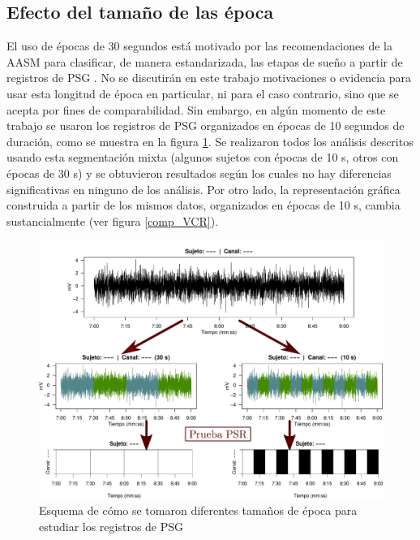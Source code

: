 
\subsection{Efecto del tama\~no de las \'epoca}

El uso de \'epocas de 30 segundos est\'a motivado por las recomendaciones de la AASM para 
clasificar, de manera estandarizada, las etapas de sue\~no a partir de registros de PSG 
\cite{AASM07}. 
No se discutir\'an en este trabajo motivaciones o evidencia para usar esta longitud de \'epoca en 
particular, ni para el caso contrario, sino que se acepta por fines de comparabilidad. 
Sin embargo, en alg\'un momento de este trabajo se usaron los registros de PSG organizados en 
\'epocas de 10 segundos de duraci\'on, como se muestra en la figura \ref{epocas_diferentes}. 
Se realizaron todos los an\'alisis descritos usando esta segmentaci\'on mixta (algunos sujetos con 
\'epocas de 10 s, otros con \'epocas de 30 s) y se obtuvieron resultados seg\'un los cuales no hay 
diferencias significativas en ninguno de los an\'alisis. 
Por otro lado, la representaci\'on gr\'afica construida a partir de los mismos datos, organizados
en \'epocas de 10 s, cambia sustancialmente (ver figura \ref{comp_VCR}).

\begin{figure}
\centering
\includegraphics[width=0.8\linewidth]{./img_diagramas/epocas_diferentes.pdf}
\caption{Esquema de c\'omo se tomaron diferentes tama\~nos de \'epoca para estudiar los registros de 
PSG}
\label{epocas_diferentes}
\end{figure}

